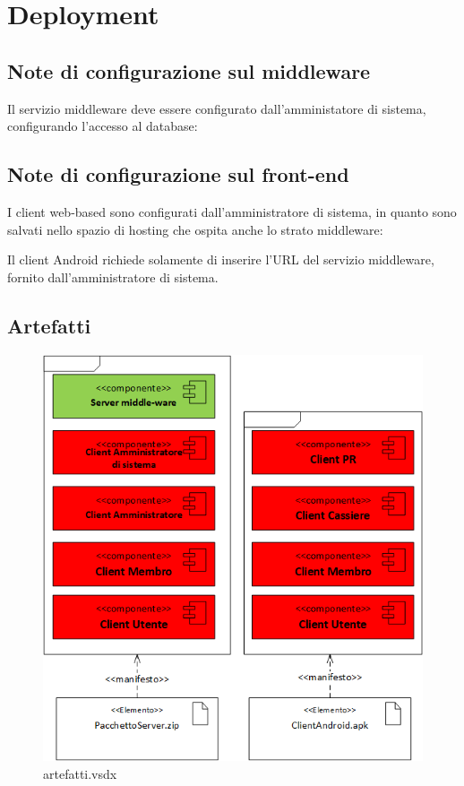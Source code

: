 \documentclass[a4paper]{article}
\begin{document}
\newpage

\section{Deployment}

\subsection{Note di configurazione sul middleware}

Il servizio middleware deve essere configurato dall'amministatore di sistema, configurando l'accesso al database:





\subsection{Note di configurazione sul front-end}

I client web-based sono configurati dall'amministratore di sistema, in quanto sono salvati nello spazio di hosting che ospita anche lo strato middleware:



Il client Android richiede solamente di inserire l'URL del servizio middleware, fornito dall'amministratore di sistema.

\subsection{Artefatti}


\begin{figure}[H]
    \includegraphics[scale=0.7]{Implementazione/artefatti.png}
    \centering
    \caption{artefatti.vsdx}
\end{figure}
\end{document}
